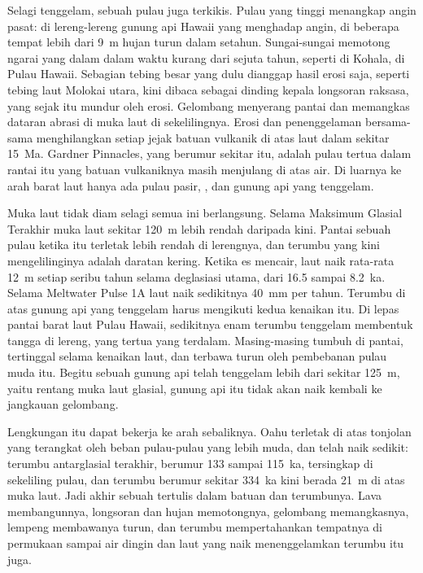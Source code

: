 Selagi tenggelam, sebuah pulau juga terkikis. Pulau yang tinggi menangkap angin pasat: di
lereng-lereng gunung api Hawaii yang menghadap angin, di beberapa tempat lebih dari \qty{9}{m} hujan turun dalam setahun.
Sungai-sungai memotong ngarai yang dalam dalam waktu kurang dari sejuta tahun, seperti di Kohala, di Pulau Hawaii.
Sebagian tebing besar yang dulu dianggap hasil erosi saja, seperti tebing laut Molokai
utara, kini dibaca sebagai dinding kepala longsoran raksasa, yang sejak itu mundur oleh erosi. Gelombang menyerang pantai dan
memangkas dataran abrasi di muka laut di sekelilingnya. Erosi dan penenggelaman bersama-sama menghilangkan setiap jejak
batuan vulkanik di atas laut dalam sekitar \qty{15}{Ma}. Gardner Pinnacles, yang berumur sekitar itu, adalah
pulau tertua dalam rantai itu yang batuan vulkaniknya masih menjulang di atas air. Di luarnya ke arah
barat laut hanya ada pulau pasir, , dan gunung api yang tenggelam.

Muka laut tidak diam selagi semua ini berlangsung. Selama Maksimum Glasial Terakhir muka laut sekitar
\qty{120}{m} lebih rendah daripada kini. Pantai sebuah pulau ketika itu terletak lebih rendah di lerengnya, dan terumbu
yang kini mengelilinginya adalah daratan kering. Ketika es mencair, laut naik rata-rata \qty{12}{m}
setiap seribu tahun selama deglasiasi utama, dari 16.5 sampai \qty{8.2}{ka}. Selama Meltwater
Pulse 1A laut naik sedikitnya \qty{40}{mm} per tahun. Terumbu di atas gunung api yang tenggelam harus mengikuti kedua
kenaikan itu. Di lepas pantai barat laut Pulau Hawaii, sedikitnya enam terumbu tenggelam membentuk
tangga di lereng, yang tertua yang terdalam. Masing-masing tumbuh di pantai, tertinggal selama kenaikan
laut, dan terbawa turun oleh pembebanan pulau muda itu. Begitu sebuah gunung api telah tenggelam lebih
dari sekitar \qty{125}{m}, yaitu rentang muka laut glasial, gunung api itu tidak akan naik kembali ke jangkauan gelombang.

Lengkungan itu dapat bekerja ke arah sebaliknya. Oahu terletak di atas tonjolan yang terangkat oleh beban pulau-pulau yang lebih muda,
dan telah naik sedikit: terumbu antarglasial terakhir, berumur 133 sampai \qty{115}{ka}, tersingkap di
sekeliling pulau, dan terumbu berumur sekitar \qty{334}{ka} kini berada \qty{21}{m} di atas muka laut. Jadi
akhir sebuah  tertulis dalam batuan dan terumbunya. Lava membangunnya, longsoran dan
hujan memotongnya, gelombang memangkasnya, lempeng membawanya turun, dan terumbu mempertahankan tempatnya di
permukaan sampai air dingin dan laut yang naik menenggelamkan terumbu itu juga.

